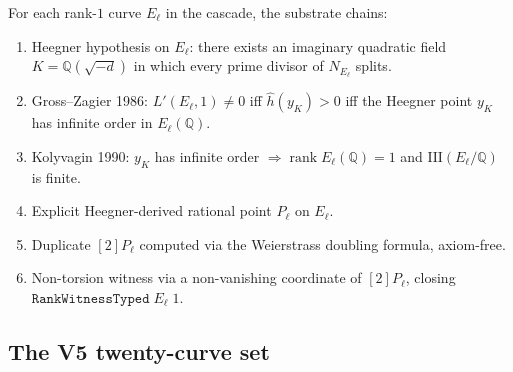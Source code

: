 \documentclass[11pt,a4paper]{article}
\theoremstyle{plain}
\theoremstyle{definition}
\theoremstyle{remark}
\newcommand{\Q}{\mathbb{Q}}
\newcommand{\rank}{\operatorname{rank}}
\newcommand{\Sha}{\mathrm{III}}
\begin{document}
For each rank-$1$ curve $E_{\ell}$ in the cascade, the substrate
chains:
\begin{enumerate}[leftmargin=*,nosep]
\item Heegner hypothesis on $E_{\ell}$: there exists an imaginary
  quadratic field $K = \Q(\sqrt{-d})$ in which every prime divisor
  of $N_{E_{\ell}}$ splits.
\item Gross--Zagier 1986: $L'(E_{\ell}, 1) \ne 0$ iff
  $\hat{h}(y_{K}) > 0$ iff the Heegner point $y_{K}$ has infinite
  order in $E_{\ell}(\Q)$.
\item Kolyvagin 1990: $y_{K}$ has infinite order $\Rightarrow
  \rank E_{\ell}(\Q) = 1$ and $\Sha(E_{\ell}/\Q)$ is finite.
\item Explicit Heegner-derived rational point $P_{\ell}$ on
  $E_{\ell}$.
\item Duplicate $[2]P_{\ell}$ computed via the Weierstrass doubling
  formula, axiom-free.
\item Non-torsion witness via a non-vanishing coordinate of
  $[2]P_{\ell}$, closing $\mathtt{RankWitnessTyped}\;E_{\ell}\;1$.
\end{enumerate}

\subsection{The V5 twenty-curve set}
\end{document}
